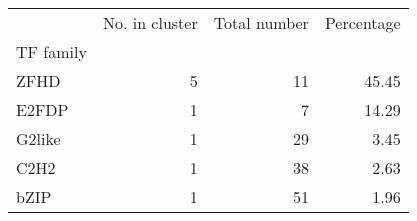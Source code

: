 \begin{tabular}{lrrr}
\toprule
{} &  No. in cluster &  Total number &  Percentage \\
TF family &                 &               &             \\
\midrule
ZFHD      &               5 &            11 &       45.45 \\
E2FDP     &               1 &             7 &       14.29 \\
G2like    &               1 &            29 &        3.45 \\
C2H2      &               1 &            38 &        2.63 \\
bZIP      &               1 &            51 &        1.96 \\
\bottomrule
\end{tabular}

